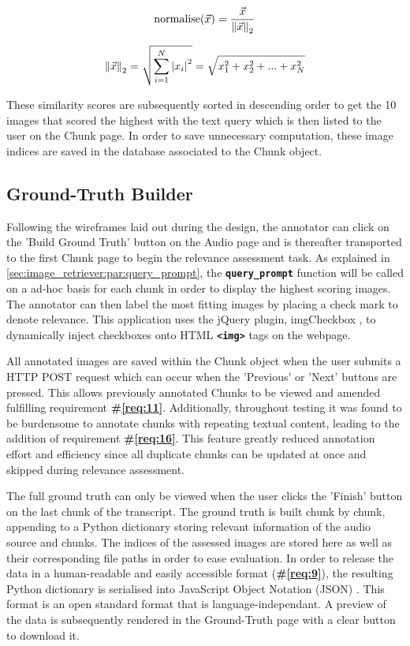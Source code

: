 \documentclass{l4proj}
\begin{document}
$$\text{normalise}(\vec{x}) = \frac{\vec{x}}{\norm{\vec{x}}_2}$$

\begin{equation}
    \norm{\vec{x}}_2 = \sqrt{\sum_{i=1}^N \abs{x_i}^2} = \sqrt{x_1^2 + x_2^2 + ... + x_N^2}
    \label{eq:euclidean_normalisation}
\end{equation}

These similarity scores are subsequently sorted in descending order to get the 10 images that scored the highest with the text query which is then listed to the user on the Chunk page. In order to save unnecessary computation, these image indices are saved in the database associated to the Chunk object.


\subsection{Ground-Truth Builder}
Following the wireframes laid out during the design, the annotator can click on the 'Build Ground Truth' button on the Audio page and is thereafter transported to the first Chunk page to begin the relevance assessment task. As explained in \ref{sec:image_retriever:par:query_prompt}, the \textbf{\lstinline|query_prompt|} function will be called on a ad-hoc basis for each chunk in order to display the highest scoring images. The annotator can then label the most fitting images by placing a check mark to denote relevance. This application uses the jQuery plugin, imgCheckbox \citep{imgcheckbox}, to dynamically inject checkboxes onto HTML \textbf{\lstinline|<img>|} tags on the webpage. 

All annotated images are saved within the Chunk object when the user submits a HTTP POST request which can occur when the 'Previous' or 'Next' buttons are pressed. This allows previously annotated Chunks to be viewed and amended fulfilling requirement \textbf{\#\ref{req:11}}. Additionally, throughout testing it was found to be burdensome to annotate chunks with repeating textual content, leading to the addition of requirement \textbf{\#\ref{req:16}}. This feature greatly reduced annotation effort and efficiency since all duplicate chunks can be updated at once and skipped during relevance assessment.

The full ground truth can only be viewed when the user clicks the 'Finish' button on the last chunk of the transcript. The ground truth is built chunk by chunk, appending to a Python dictionary storing relevant information of the audio source and chunks. The indices of the assessed images are stored here as well as their corresponding file paths in order to ease evaluation. In order to release the data in a human-readable and easily accessible format (\textbf{\#\ref{req:9}}), the resulting Python dictionary is serialised into JavaScript Object Notation (JSON) \citep{json}. This format is an open standard format that is language-independant. A preview of the data is subsequently rendered in the Ground-Truth page with a clear button to download it.
\end{document}
